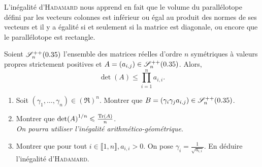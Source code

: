 L'inégalité d'\textsc{Hadamard} nous apprend en fait que le volume du parallélotope défini par les vecteurs colonnes est inférieur ou égal au produit des normes de ses vecteurs et il y a égalité si et seulement si la matrice est diagonale, ou encore que le parallélotope est rectangle. 


\begin{prop}{}
    Soient $\mathscr{S}_n ^{++} (0.35)$ l'ensemble des matrices réelles d'ordre $n$ symétriques à valeurs propres strictement positives et $A = (a_{i,j}) \in \mathscr{S}_n ^{++} (0.35)$. Alors,
    $$\det(A) \leqslant \prod_{i=1}^{n} a_{i,i}.$$
\end{prop}

\begin{exercice}    
\begin{enumerate}
    \item Soit $(\gamma_1, \dots, \gamma_n) \in (\Re)^n$. Montrer que $B = (\gamma_i \gamma_j a_{i,j}) \in \mathscr{S}_n^{++}(0.35)$. 
    \item Montrer que $\det(A)^{1/n} \leqslant \frac{\mathrm{Tr}(A)}{n}$. \\
    \emph{On pourra utiliser l'inégalité arithmético-géométrique}.
    
    \item Montrer que pour tout $i \in \llbracket 1, n \rrbracket, a_{i,i} > 0$. On pose $\gamma_i = \frac{1}{\sqrt{a_{i,i}}}$. En déduire l'inégalité d'\textsc{Hadamard}.
\end{enumerate}
\end{exercice}
